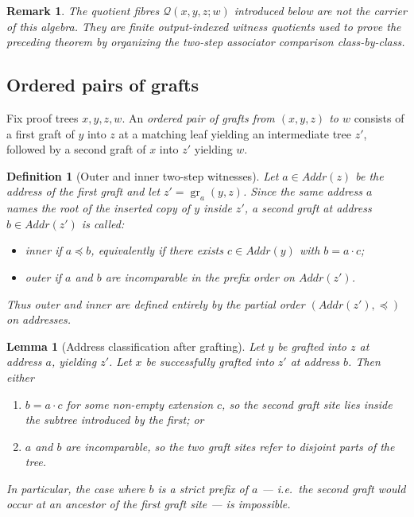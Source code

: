 \documentclass[11pt]{article}
\newtheorem{lemma}[theorem]{Lemma}
\newtheorem{definition}[theorem]{Definition}
\newtheorem{remark}[theorem]{Remark}
\newcommand{\Addr}{\mathit{Addr}}
\newcommand{\Qclass}{\mathcal{Q}}
\newcommand{\graftat}[3]{\operatorname{gr}_{#2}(#3,#1)}
\begin{document}
\begin{remark}
The quotient fibres \(\Qclass(x,y,z;w)\) introduced below are not the carrier of
this algebra. They are finite output-indexed witness quotients used to prove the
preceding theorem by organizing the two-step associator comparison class-by-class.
\end{remark}

\subsection{Ordered pairs of grafts}

Fix proof trees \(x,y,z,w\). An \emph{ordered pair of grafts from \((x,y,z)\)
to \(w\)} consists of a first graft of \(y\) into \(z\) at a matching leaf
yielding an intermediate tree \(z'\), followed by a second graft of \(x\) into
\(z'\) yielding \(w\).

\begin{definition}[Outer and inner two-step witnesses]
Let \(a\in \Addr(z)\) be the address of the first graft and let
\(z'=\graftat{z}{a}{y}\). Since the same address \(a\) names the root of the
inserted copy of \(y\) inside \(z'\), a second graft at address
\(b\in \Addr(z')\) is called:
\begin{itemize}
\item \emph{inner} if \(a\preceq b\), equivalently if there exists
\(c\in \Addr(y)\) with \(b=a\cdot c\);
\item \emph{outer} if \(a\) and \(b\) are incomparable in the prefix order on
\(\Addr(z')\).
\end{itemize}
Thus outer and inner are defined entirely by the partial order
\((\Addr(z'),\preceq)\) on addresses.
\end{definition}

\begin{lemma}[Address classification after grafting]
\label{lem:addr-class}
Let $y$ be grafted into $z$ at address $a$, yielding $z'$. Let $x$ be
successfully grafted into $z'$ at address $b$. Then either
\begin{enumerate}[label=\textup{(\roman*)}]
\item $b = a\cdot c$ for some non-empty extension $c$, so the second
graft site lies inside the subtree introduced by the first; or
\item $a$ and $b$ are incomparable, so the two graft sites refer to disjoint
parts of the tree.
\end{enumerate}
In particular, the case where $b$ is a strict prefix of $a$ --- i.e.\ the
second graft would occur at an ancestor of the first graft site --- is
impossible.
\end{lemma}
\end{document}
